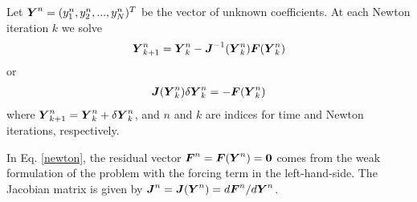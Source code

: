 Let $\boldsymbol{Y}^n = (y_1^n,y_2^n,...,y_N^n)^T$ be the vector of unknown coefficients.  At each Newton iteration $k$ we solve
\begin{align}
  \boldsymbol{Y}_{k+1}^{n} = \boldsymbol{Y}_{k}^{n} 
  - \boldsymbol{J}^{-1}(\boldsymbol{Y}_{k}^{n}) \boldsymbol{F}(\boldsymbol{Y}_{k}^{n})
\end{align}
or
\begin{align}
  \boldsymbol{J}(\boldsymbol{Y}_{k}^{n}) \delta\boldsymbol{Y}_{k}^{n} = - \boldsymbol{F}(\boldsymbol{Y}_{k}^{n}) \label{newton}
\end{align}
where $\boldsymbol{Y}_{k+1}^{n} = \boldsymbol{Y}_{k}^{n} + \delta\boldsymbol{Y}_{k}^{n}$, and $n$ and $k$ are indices for time and Newton iterations, respectively.

In Eq. \eqref{newton}, the residual vector $\boldsymbol{F}^{n}=\boldsymbol{F}(\boldsymbol{Y}^n)=\boldsymbol{0}$ comes from the weak formulation of the problem with the forcing term in the left-hand-side.  The Jacobian matrix is given by $\boldsymbol{J}^{n}=\boldsymbol{J}(\boldsymbol{Y}^{n})=d\boldsymbol{F}^{n}/d\boldsymbol{Y}^{n}$.
